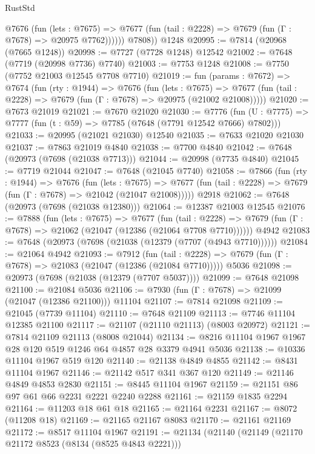 \begin{lexlean}{RustStd}
\begin{coremodule}
            @7676
              (fun (lets : @7675) =>
              @7677 (fun (tail : @2228) => @7679 (fun (Γ : @7678) => @20975 @7762))))))
        @7808))
    @1248
@20995 := @7814 (@20968 (@7665 @1248))
@20998 := @7727 (@7728 @1248) @12542
@21002 := @7648 (@7719 (@20998 @7736) @7740)
@21003 := @7753 @1248
@21008 := @7750 (@7752 @21003 @12545 @7708 @7710)
@21019 := fun (params : @7672) =>
  @7674
    (fun (rty : @1944) =>
    @7676
      (fun (lets : @7675) =>
      @7677 (fun (tail : @2228) => @7679 (fun (Γ : @7678) => @20975 (@21002 @21008)))))
@21020 := @7673 @21019
@21021 := @7670 @21020
@21030 := @7776
    (fun (U : @7775) => @7777 (fun (t : @59) => @7785 (@7648 (@7791 @12542 @7666) @7802)))
@21033 := @20995 (@21021 @21030) @12540
@21035 := @7633 @21020 @21030
@21037 := @7863 @21019 @4840
@21038 := @7700 @4840
@21042 := @7648 (@20973 (@7698 (@21038 @7713)))
@21044 := @20998 (@7735 @4840)
@21045 := @7719 @21044
@21047 := @7648 (@21045 @7740)
@21058 := @7866
    (fun (rty : @1944) =>
    @7676
      (fun (lets : @7675) =>
      @7677 (fun (tail : @2228) => @7679 (fun (Γ : @7678) => @21042 (@21047 @21008)))))
    @2918
@21062 := @7648 (@20973 (@7698 (@21038 @12380)))
@21064 := @12387 @21003 @12545
@21076 := @7888
    (fun (lets : @7675) =>
    @7677
      (fun (tail : @2228) =>
      @7679 (fun (Γ : @7678) => @21062 (@21047 (@12386 (@21064 @7708 @7710))))))
    @4942
@21083 := @7648 (@20973 (@7698 (@21038 (@12379 (@7707 (@4943 @7710))))))
@21084 := @21064 @4942
@21093 := @7912
    (fun (tail : @2228) => @7679 (fun (Γ : @7678) => @21083 (@21047 (@12386 (@21084 @7710)))))
    @5036
@21098 := @20973 (@7698 (@21038 (@12379 (@7707 @5037))))
@21099 := @7648 @21098
@21100 := @21084 @5036
@21106 := @7930 (fun (Γ : @7678) => @21099 (@21047 (@12386 @21100))) @11104
@21107 := @7814 @21098
@21109 := @21045 (@7739 @11104)
@21110 := @7648 @21109
@21113 := @7746 @11104 @12385 @21100
@21117 := @21107 (@21110 @21113) (@8003 @20972)
@21121 := @7814 @21109 @21113 (@8008 @21044)
@21134 := @8216 @11104 @1967 @1967 @28 @120 @519 @1246 @64 @4857 @28 @3379 @4941 @5036
@21138 := @10336 @11104 @1967 @519 @120
@21140 := @21138 @4849 @4855
@21142 := @8431 @11104 @1967
@21146 := @21142 @517 @341 @367 @120
@21149 := @21146 @4849 @4853 @2830
@21151 := @8445 @11104 @1967
@21159 := @21151 @86 @97 @61 @66 @2231 @2221 @2240 @2288
@21161 := @21159 @1835 @2294
@21164 := @11203 @18 @61 @18
@21165 := @21164 @2231
@21167 := @8072 (@11208 @18)
@21169 := @21165 @21167 @8083
@21170 := @21161 @21169
@21172 := @8517 @11104 @1967
@21191 := @21134
    (@21140
      (@21149
        (@21170 @21172 @8523 (@8134 (@8525 @4843 @2221)))

\end{coremodule}
\end{lexlean}
